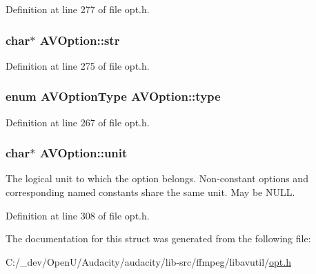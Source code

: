Definition at line 277 of file opt.\+h.

\subsubsection[{\texorpdfstring{str}{str}}]{ char$\ast$ A\+V\+Option\+::str}\hypertarget{struct_a_v_option_a3edf01c0c79e387474ef38a3d9e6f79c}{}\label{struct_a_v_option_a3edf01c0c79e387474ef38a3d9e6f79c}


Definition at line 275 of file opt.\+h.

\subsubsection[{\texorpdfstring{type}{type}}]{\setlength{\rightskip}{0pt plus 5cm}enum {\bf A\+V\+Option\+Type} A\+V\+Option\+::type}\hypertarget{struct_a_v_option_af50f9be082b4b1cf0d76b1e24face3bc}{}\label{struct_a_v_option_af50f9be082b4b1cf0d76b1e24face3bc}


Definition at line 267 of file opt.\+h.

\subsubsection[{\texorpdfstring{unit}{unit}}]{ char$\ast$ A\+V\+Option\+::unit}\hypertarget{struct_a_v_option_a248d65a7cab7d7bd3a4eb51212ab0e49}{}\label{struct_a_v_option_a248d65a7cab7d7bd3a4eb51212ab0e49}
The logical unit to which the option belongs. Non-\/constant options and corresponding named constants share the same unit. May be N\+U\+LL. 

Definition at line 308 of file opt.\+h.



The documentation for this struct was generated from the following file\+:\begin{DoxyCompactItemize}
\item 
C\+:/\+\_\+dev/\+Open\+U/\+Audacity/audacity/lib-\/src/ffmpeg/libavutil/\hyperlink{opt_8h}{opt.\+h}\end{DoxyCompactItemize}
